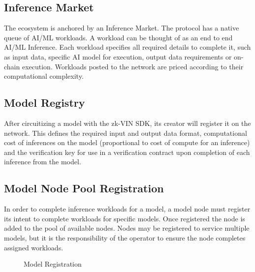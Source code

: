 \documentclass[conference]{IEEEtran}
\begin{document}
\subsection{Inference Market}

The ecosystem is anchored by an Inference Market. The protocol has a native queue of AI/ML workloads. A workload can be thought of as an end to end AI/ML Inference. Each workload specifies all required details to complete it, such as input data, specific AI model for execution, output data requirements or on-chain execution. Workloads posted to the network are priced according to their computational complexity.

\subsection{Model Registry}

After circuitizing a model with the zk-VIN SDK, its creator will register it on the network. This defines the required input and output data format, computational cost of inferences on the model (proportional to cost of compute for an inference) and the verification key for use in a verification contract upon completion of each inference from the model.

\subsection{Model Node Pool Registration}

In order to complete inference workloads for a model, a model node must register its intent to complete workloads for specific models. Once registered the node is added to the pool of available nodes. Nodes may be registered to service multiple models, but it is the responsibility of the operator to ensure the node completes assigned workloads.

\begin{figure}[!ht]
    \centering
{}
    \caption{Model Registration}
    \label{fig:Fig 3}
\end{figure}
\end{document}

